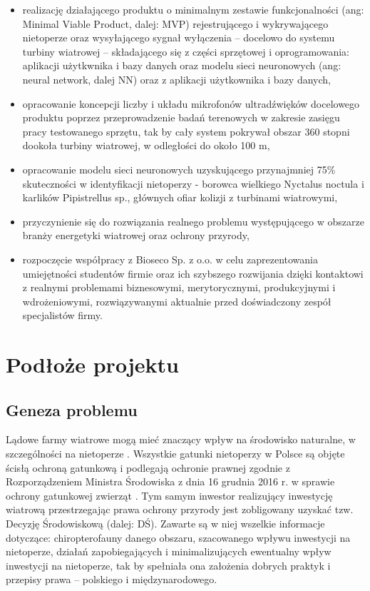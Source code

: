 \documentclass{sprz}
\begin{document}
\begin{itemize}
  \item{realizację działającego produktu o minimalnym zestawie funkcjonalności (ang: Minimal Viable Product, dalej: MVP) rejestrującego i wykrywającego nietoperze oraz wysyłającego sygnał wyłączenia – docelowo do systemu turbiny wiatrowej – składającego się z części sprzętowej i oprogramowania: aplikacji użytkwnika i bazy danych oraz modelu sieci neuronowych (ang: neural network, dalej NN) oraz z aplikacji użytkownika i bazy danych,}
  \item{opracowanie koncepcji liczby i układu mikrofonów ultradźwięków docelowego produktu poprzez przeprowadzenie badań terenowych w zakresie zasięgu pracy testowanego sprzętu, tak by cały system pokrywał obszar 360 stopni dookoła turbiny wiatrowej, w odległości do około 100 m,}
  \item{opracowanie modelu sieci neuronowych uzyskującego przynajmniej 75\% skuteczności w identyfikacji nietoperzy - borowca wielkiego Nyctalus noctula i karlików Pipistrellus sp., głównych ofiar kolizji z turbinami wiatrowymi,}
  \item{przyczynienie się do rozwiązania realnego problemu występującego w obszarze branży energetyki wiatrowej oraz ochrony przyrody,}
  \item{rozpoczęcie współpracy z Bioseco Sp. z o.o. w celu zaprezentowania umiejętności studentów firmie oraz ich szybszego rozwijania dzięki kontaktowi z realnymi problemami biznesowymi, merytorycznymi, produkcyjnymi i wdrożeniowymi, rozwiązywanymi aktualnie przed doświadczony zespół specjalistów firmy.}
  \end{itemize}
  

\chapter{Podłoże projektu}

\section{Geneza problemu}

Lądowe farmy wiatrowe mogą mieć znaczący wpływ na środowisko naturalne, w szczególności na nietoperze \cite{Wytyczne}. Wszystkie gatunki nietoperzy w Polsce są objęte ścisłą ochroną gatunkową i podlegają ochronie prawnej zgodnie z Rozporządzeniem Ministra Środowiska z dnia 16 grudnia 2016 r. w sprawie ochrony gatunkowej zwierząt \cite{Rozporządzenie}. Tym samym inwestor realizujący inwestycję wiatrową przestrzegając prawa ochrony przyrody jest zobligowany uzyskać tzw. Decyzję Środowiskową (dalej: DŚ). Zawarte są w niej 
wszelkie informacje dotyczące: chiropterofauny danego obszaru, szacowanego wpływu inwestycji na nietoperze, działań zapobiegających i minimalizujących ewentualny wpływ inwestycji na nietoperze, tak by spełniała ona założenia dobrych praktyk i przepisy prawa – polskiego 
i międzynarodowego. 
\end{document}
